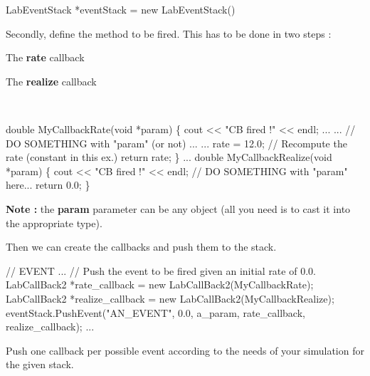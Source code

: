 \begin{DoxyCode}
LabEventStack *eventStack = \textcolor{keyword}{new} LabEventStack()
\end{DoxyCode}


Secondly, define the method to be fired. This has to be done in two steps \+:
\begin{DoxyItemize}
\item The {\bfseries rate} callback
\item The {\bfseries realize} callback
\end{DoxyItemize}

~\newline



\begin{DoxyCode}
\textcolor{keywordtype}{double} MyCallbackRate(\textcolor{keywordtype}{void} *param)
\{
        cout << \textcolor{stringliteral}{"CB fired !"} << endl;
        ...
        ...                                         \textcolor{comment}{// DO SOMETHING with "param" (or not) ...}
        ...
        rate = 12.0;                                \textcolor{comment}{// Recompute the rate (constant in this ex.)}
        \textcolor{keywordflow}{return} rate;
\}
...
double MyCallbackRealize(\textcolor{keywordtype}{void} *param)
\{
        cout << \textcolor{stringliteral}{"CB fired !"} << endl;
        \textcolor{comment}{// DO SOMETHING with "param" here...}
        \textcolor{keywordflow}{return} 0.0;
\}
\end{DoxyCode}


{\bfseries Note \+:} the {\bfseries param} parameter can be any object (all you need is to cast it into the appropriate type).

Then we can create the callbacks and push them to the stack.


\begin{DoxyCode}
\textcolor{comment}{// EVENT}
...
\textcolor{comment}{// Push the event to be fired given an initial rate of 0.0.}
LabCallBack2 *rate\_callback = \textcolor{keyword}{new} LabCallBack2(MyCallbackRate);
LabCallBack2 *realize\_callback = \textcolor{keyword}{new} LabCallBack2(MyCallbackRealize);
eventStack.PushEvent(\textcolor{stringliteral}{"AN\_EVENT"}, 0.0, a\_param, rate\_callback, realize\_callback);
...
\end{DoxyCode}


Push one callback per possible event according to the needs of your simulation for the given stack. 

